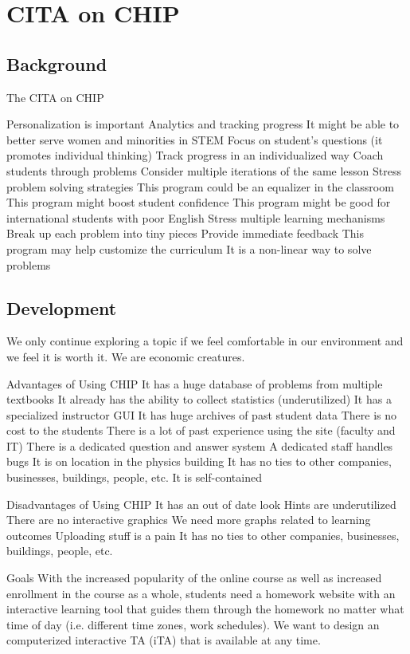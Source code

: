 \chapter[Chapter 5: CITA on CHIP]{CITA on CHIP}

\section{Background}

The CITA on CHIP

Personalization is important
Analytics and tracking progress
It might be able to better serve women and minorities in STEM
Focus on student’s questions (it promotes individual thinking)
Track progress in an individualized way
Coach students through problems
Consider multiple iterations of the same lesson
Stress problem solving strategies
This program could be an equalizer in the classroom
This program might boost student confidence
This program might be good for international students with poor English
Stress multiple learning mechanisms
Break up each problem into tiny pieces
Provide immediate feedback
This program may help customize the curriculum
It is a non-linear way to solve problems

\section{Development}

We only continue exploring a topic if we feel comfortable in our environment and we feel it is worth it. We are economic creatures.

Advantages of Using CHIP
It has a huge database of problems from multiple textbooks
It already has the ability to collect statistics (underutilized)
It has a specialized instructor GUI
It has huge archives of past student data
There is no cost to the students
There is a lot of past experience using the site (faculty and IT)
There is a dedicated question and answer system
A dedicated staff handles bugs
It is on location in the physics building
It has no ties to other companies, businesses, buildings, people, etc.
It is self-contained

Disadvantages of Using CHIP
It has an out of date look
Hints are underutilized
There are no interactive graphics
We need more graphs related to learning outcomes
Uploading stuff is a pain
It has no ties to other companies, businesses, buildings, people, etc.

Goals
With the increased popularity of the online course as well as increased enrollment in the course as a whole, students need a homework website with an interactive learning tool that guides them through the homework no matter what time of day (i.e. different time zones, work schedules).  We want to design an computerized interactive TA (iTA) that is available at any time.

